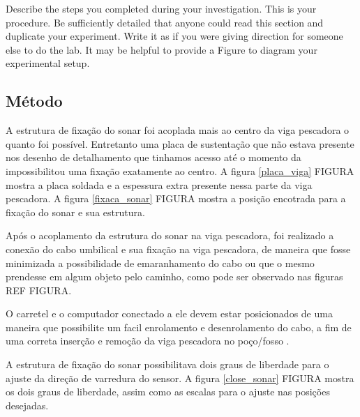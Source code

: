 
Describe the steps you completed during your investigation. This is your procedure. Be sufficiently detailed that anyone could read this section and duplicate your experiment. Write it as if you were giving direction for someone else to do the lab. It may be helpful to provide a Figure to diagram your experimental setup.


\subsection{Método}

A estrutura de fixação do sonar foi acoplada mais ao centro da viga pescadora o
quanto foi possível. Entretanto uma placa de sustentação que não estava presente
nos desenho de detalhamento que tinhamos acesso até o momento da impossibilitou
uma fixação exatamente ao centro. A figura \ref{placa_viga} FIGURA mostra a
placa soldada e a espessura extra presente nessa parte da viga pescadora. A figura
\ref{fixaca_sonar} FIGURA mostra a posição encotrada para a fixação do sonar e
sua estrutura.

Após o acoplamento da estrutura do sonar na viga pescadora, foi realizado a
conexão do cabo umbilical e sua fixação na viga pescadora, de maneira que fosse
minimizada a possibilidade de emaranhamento do cabo ou que o mesmo prendesse em
algum objeto pelo caminho, como pode ser observado nas figuras REF FIGURA.

O carretel e o computador conectado a ele devem estar posicionados de uma
maneira que possibilite um facil enrolamento e desenrolamento do cabo, a fim de
uma correta inserção e remoção da viga pescadora no poço/fosso %
.

A estrutura de fixação do sonar possibilitava dois graus de liberdade para o
ajuste da direção de varredura do sensor. A figura \ref{close_sonar} FIGURA
mostra os dois graus de liberdade, assim como as escalas para o ajuste nas
posições desejadas.




 

\label{metodos}


